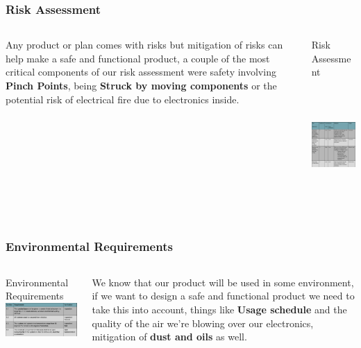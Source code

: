\documentclass[aspectratio=169]{beamer}
\begin{document}
\begin{frame}
    \frametitle{Risk Assessment}

    \begin{columns}
        \begin{column}{0.48\textwidth}
            Any product or plan comes with risks but mitigation of risks can help make a safe
            and functional product, a couple of the most critical components of our risk assessment
            were safety involving \textbf{Pinch Points}, being \textbf{Struck by moving components}
            or the potential risk of electrical fire due to electronics inside.
        \end{column}

        \begin{column}{0.48\textwidth}
            \begin{block}{Risk Assessment}
                \includegraphics[height=5cm]{RiskAssesment}
            \end{block}
        \end{column}
    \end{columns}
\end{frame}

\begin{frame}
    \frametitle{Environmental Requirements}

    \begin{columns}
        \begin{column}{0.48\textwidth}
            \begin{block}{Environmental Requirements}
                \includegraphics[width=7.3cm]{EnviromentalAndSafety}
            \end{block}
        \end{column}

        \begin{column}{0.48\textwidth}
            We know that our product will be used in some environment, if we want to design a safe
            and functional product we need to take this into account, things like \textbf{Usage schedule}
            and the quality of the air we're blowing over our electronics, mitigation of
            \textbf{dust and oils} as well.
        \end{column}
    \end{columns}
\end{frame}
\end{document}
